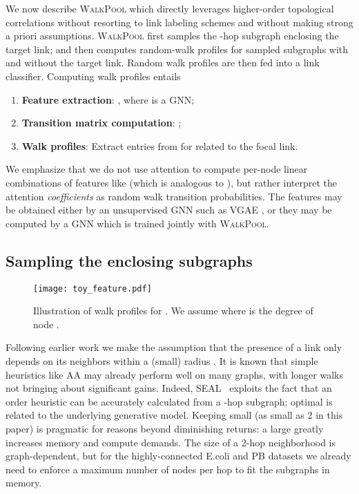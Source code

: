 \documentclass[11pt]{article}
\newcommand{\walkpool}{\textsc{WalkPool}\xspace}
\begin{document}
We now describe \walkpool which directly leverages higher-order topological correlations without resorting to link labeling schemes and without making strong a priori assumptions. \walkpool first samples the -hop subgraph  enclosing the target link; and then computes random-walk profiles for sampled subgraphs with and without the target link. Random walk profiles are then fed into a link classifier.
Computing walk profiles entails
\vspace{-1mm}
\begin{enumerate}
    \item \textbf{Feature extraction}: , where  is a GNN;
    \vspace{-1mm}
    \item \textbf{Transition matrix computation}: ;
    \vspace{-1mm}
    \item \textbf{Walk profiles}: Extract entries from  for  related to the focal link.
\end{enumerate}
\vspace{-1mm}
We emphasize that we do not use attention to compute per-node linear combinations of features like \cite{velivckovic2017graph} (which is analogous to \cite{vaswani2017attention}), but rather interpret the attention \emph{coefficients} as random walk transition probabilities. The features  may be obtained either by an unsupervised GNN such as VGAE \citep{kipf2016variational}, or they may be computed by a GNN which is trained jointly with \walkpool.



\vspace{-2mm}
\subsection{Sampling the enclosing subgraphs}
\begin{wrapfigure}{l}{0.6\textwidth} 
\centering
\vspace{-4mm}
\texttt{[image: toy\_feature.pdf]}
\caption{Illustration of walk profiles for . We assume  where  is the degree of node .}
\label{fig:features}
\end{wrapfigure}
Following earlier work we make the assumption that the presence of a link only depends on its neighbors within a (small) radius . It is known that simple heuristics like AA may already perform well on many graphs, with longer walks not bringing about significant gains. Indeed, SEAL~\citep{zhang2018link} exploits the fact that an order  heuristic can be accurately calculated from a -hop subgraph; optimal  is related to the underlying generative model. Keeping  small (as small as 2 in this paper) is pragmatic for reasons beyond diminishing returns: a large  greatly increases memory and compute demands. The size of a 2-hop neighborhood is graph-dependent, but for the highly-connected E.coli and PB datasets we already need to enforce a maximum number of nodes per hop to fit the subgraphs in memory.
\end{document}
